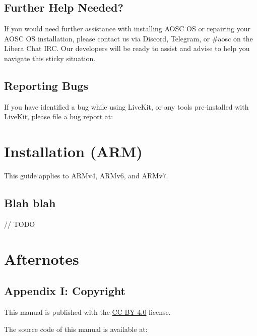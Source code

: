 

    \section{Further Help Needed?}

    If you would need further assistance with installing AOSC OS or repairing your AOSC OS installation,
    please contact us via Discord, Telegram, or \#aosc on the Libera Chat IRC.
    Our developers will be ready to assist and advise to help you navigate this sticky situation.

    \section{Reporting Bugs}

    If you have identified a bug while using LiveKit, or any tools pre-installed with LiveKit, please file a bug report at:






    \chapter{Installation (ARM)}

    This guide applies to ARMv4, ARMv6, and ARMv7.
    
    \section{Blah blah}

    // TODO





    \chapter{Afternotes}
    
    \section{Appendix I: Copyright}

    This manual is published with the \underline{CC BY 4.0} license.

    The source code of this manual is available at:

